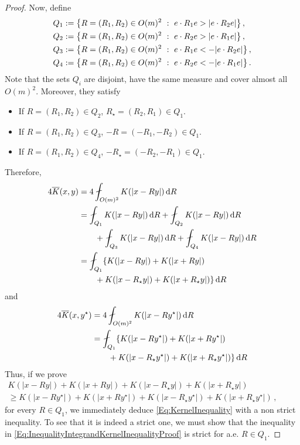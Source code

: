 \begin{proof}
Now, define
\begin{align*}
Q_1 &:= \left \{ R = (R_1,R_2) \in O(m)^2 \ : \ e\cdot R_1 e > |e\cdot R_2 e| \right \},\\
Q_2 &:= \left \{ R = (R_1,R_2) \in O(m)^2 \ : \ e\cdot R_2 e > |e\cdot R_1 e| \right \},\\
Q_3 &:= \left \{ R = (R_1,R_2) \in O(m)^2 \ : \ e\cdot R_1 e < -|e\cdot R_2 e| \right \},\\
Q_4 &:= \left \{ R = (R_1,R_2) \in O(m)^2 \ : \ e\cdot R_2 e < - |e\cdot R_1 e| \right \}.
\end{align*}
Note that the sets $Q_i$ are disjoint, have the same measure and cover almost all $O(m)^2$. Moreover, they satisfy
\begin{itemize}
\item If $R = (R_1, R_2)\in Q_2$, $R_\star = (R_2, R_1) \in Q_1$.
\item If $R = (R_1, R_2)\in Q_3$, $-R = (-R_1, -R_2) \in Q_1$.
\item If $R = (R_1, R_2)\in Q_4$, $-R_\star = (-R_2, -R_1) \in Q_1$.
\end{itemize}
Therefore,
\begin{align*}
4\overline{K} (x, y) &= 4\average_{O(m)^2} K(|x - R y|)\d R \\
& = \average_{Q_1} K(|x - R y|)\d R + \average_{Q_2} K(|x - R y|)\d R \\
& \quad \quad
+ \average_{Q_3} K(|x - R y|)\d R +
\average_{Q_4} K(|x - R y|)\d R \\
&= \average_{Q_1} \{K(|x - R y|) + K(|x + R y|) \\
&\quad \quad + K(|x - R_\star y|) + K(|x + R_\star y|)\}\d R
\end{align*}
and
\begin{align*}
4\overline{K} (x, y^\star) &= 4\average_{O(m)^2} K(|x - R y^\star|)\d R \\
& = \average_{Q_1} \{K(|x - R y^\star|) + K(|x + R y^\star|) \\
&\quad \quad + K(|x - R_\star y^\star|) + K(|x + R_\star y^\star|)\}\d R
\end{align*}
Thus, if we prove
\begin{equation}
\label{Eq:InequalityIntegrandKernelInequalityProof}
\begin{split}
K(|x - R y|) + K(|x + R y|) + K(|x - R_\star y|) + K(|x + R_\star y|)
\quad \quad \quad \quad \quad \quad \quad \quad
\\
\geq
K(|x - R y^\star|) + K(|x + R y^\star|)+K(|x - R_\star y^\star|) + K(|x + R_\star y^\star|)\,,
\end{split}
\end{equation}
for every $R\in Q_1$, we immediately deduce \eqref{Eq:KernelInequality} with a non strict inequality. To see that it is indeed a strict one, we must show that the inequality in \eqref{Eq:InequalityIntegrandKernelInequalityProof} is strict for a.e. $R \in Q_1$.



\end{proof}
